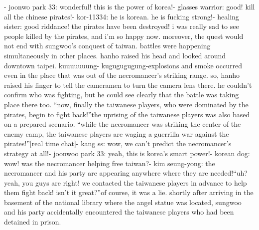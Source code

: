 - joonwo park 33: wonderful! this is the power of korea!- glasses warrior: good! kill all the chinese pirates!- kor-11334: he is korean.
 he is fucking strong!- healing sister: good riddance! the pirates have been destroyed! i was really sad to see people killed by the pirates, and i’m so happy now.
moreover, the quest would not end with sungwoo’s conquest of taiwan.
 battles were happening simultaneously in other places.
hanho raised his head and looked around downtown taipei.
kuuuuuuung- kugugugugung-explosions and smoke occurred even in the place that was out of the necromancer’s striking range.
 so, hanho raised his finger to tell the cameramen to turn the camera lens there.
he couldn’t confirm who was fighting, but he could see clearly that the battle was taking place there too.
“now, finally the taiwanese players, who were dominated by the pirates, begin to fight back!”the uprising of the taiwanese players was also based on a prepared scenario.
“while the necromancer was striking the center of the enemy camp, the taiwanese players are waging a guerrilla war against the pirates!”[real time chat]- kang ss: wow, we can’t predict the necromancer’s strategy at all!- joonwoo park 33: yeah, this is korea’s smart power!- korean dog: wow! was the necromancer helping free taiwan?- kim seung-yong: the necromancer and his party are appearing anywhere where they are needed!“uh? yeah, you guys are right! we contacted the taiwanese players in advance to help them fight back! isn’t it great?”of course, it was a lie.
 shortly after arriving in the basement of the national library where the angel statue was located, sungwoo and his party accidentally encountered the taiwanese players who had been detained in prison.

